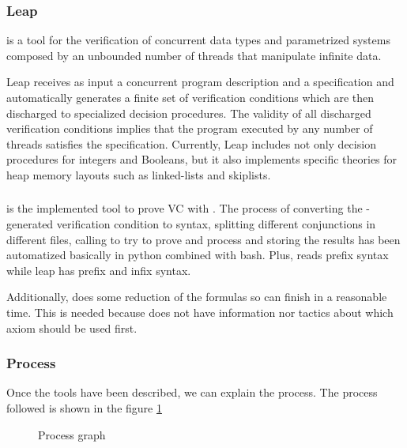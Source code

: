 \subsubsection{Leap}

\leap is a tool for the verification of concurrent data types and parametrized systems composed by an unbounded number of threads that manipulate infinite data.

Leap receives as input a concurrent program description and a specification and automatically generates a finite set of verification conditions which are then discharged to specialized decision procedures. 
%
The validity of all discharged verification conditions implies that the program executed by any number of threads satisfies the specification. 
%
Currently, Leap includes not only decision procedures for integers and Booleans, but it also implements specific theories for heap memory layouts such as linked-lists and skiplists.


\subsubsection{\gandalf}

\gandalf is the implemented tool to prove \gls{VC} with \spass. 
%
The process of converting the \leap-generated verification condition to \spass syntax, splitting different conjunctions in different files, calling \spass to try to prove and process and storing the results has been automatized basically in python combined with bash.
Plus, \spass reads prefix syntax while leap has prefix and infix syntax.

Additionally, \gandalf does some reduction of the formulas so \spass can finish in a reasonable time.
%
This is needed because \spass does not have information nor tactics about which axiom should be used first.



\subsubsection{Process}

\label{ProcessDescription}
Once the tools have been described, we can explain the process. 
%
The process followed is shown in the figure \ref{fig:process}


\begin{figure}

\caption{Process graph}
\label{fig:process}
\end{figure}

